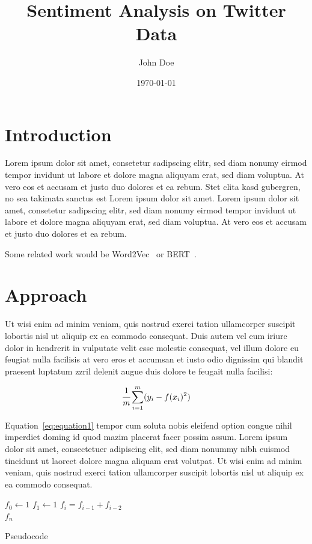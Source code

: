 \documentclass{article}
\title{Sentiment Analysis on Twitter Data}
\author{John Doe}
\date{\today}
\begin{document}
\maketitle

\section{Introduction}
Lorem ipsum dolor sit amet, consetetur sadipscing elitr, sed diam nonumy eirmod tempor invidunt ut labore et dolore magna aliquyam erat, sed diam voluptua. At vero eos et accusam et justo duo dolores et ea rebum. Stet clita kasd gubergren, no sea takimata sanctus est Lorem ipsum dolor sit amet. Lorem ipsum dolor sit amet, consetetur sadipscing elitr, sed diam nonumy eirmod tempor invidunt ut labore et dolore magna aliquyam erat, sed diam voluptua. At vero eos et accusam et justo duo dolores et ea rebum.

Some related work would be Word2Vec~\cite{Word2Vec} or BERT~\cite{BERT}.


\section{Approach}
Ut wisi enim ad minim veniam, quis nostrud exerci tation ullamcorper suscipit lobortis nisl ut aliquip ex ea commodo consequat. Duis autem vel eum iriure dolor in hendrerit in vulputate velit esse molestie consequat, vel illum dolore eu feugiat nulla facilisis at vero eros et accumsan et iusto odio dignissim qui blandit praesent luptatum zzril delenit augue duis dolore te feugait nulla facilisi:

\begin{align}
    \cfrac{1}{m}\sum_{i=1}^m(y_i - f(x_i)^2)
    \label{eq:equation1}
\end{align}

Equation~\ref{eq:equation1} tempor cum soluta nobis eleifend option congue nihil imperdiet doming id quod mazim placerat facer possim assum. Lorem ipsum dolor sit amet, consectetuer adipiscing elit, sed diam nonummy nibh euismod tincidunt ut laoreet dolore magna aliquam erat volutpat. Ut wisi enim ad minim veniam, quis nostrud exerci tation ullamcorper suscipit lobortis nisl ut aliquip ex ea commodo consequat.

\begin{algorithm}[h]
    \begin{algorithmic}
        \State $f_0 \gets 1$
        \State $f_1 \gets 1$
        \State $f_i=f_{i-1}+f_{i-2}$
        \EndFor\\
        \Return $f_n$
    \end{algorithmic}
    \caption{Pseudocode}
    \label{alg:cap}
\end{algorithm}
\end{document}
